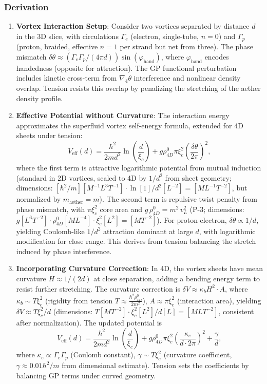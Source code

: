 \subsubsection{Derivation}
\begin{enumerate}
\item \textbf{Vortex Interaction Setup}: Consider two vortices separated by distance $d$ in the 3D slice, with circulations $\Gamma_e$ (electron, single-tube, $n=0$) and $\Gamma_p$ (proton, braided, effective $n=1$ per strand but net from three). The phase mismatch $\delta \theta \approx (\Gamma_e \Gamma_p / (4\pi d)) \sin(\varphi_{\text{hand}})$, where $\varphi_{\text{hand}}$ encodes handedness (opposite for attraction). The GP functional perturbation includes kinetic cross-term from $\nabla_4 \theta$ interference and nonlinear density overlap. Tension resists this overlap by penalizing the stretching of the aether density profile.

\item \textbf{Effective Potential without Curvature}: The interaction energy approximates the superfluid vortex self-energy formula, extended for 4D sheets under tension:
   \[
   V_{\text{eff}}(d) = \frac{\hbar^2}{2 m d^2} \ln\left(\frac{d}{\xi_c}\right) + g \rho_{4D}^0 \pi \xi_c^2 \left( \frac{\delta \theta}{2\pi} \right)^2,
   \]
   where the first term is attractive logarithmic potential from mutual induction (standard in 2D vortices, scaled to 4D by $1/d^2$ from sheet geometry; dimensions: $[\hbar^2 / m] [M^{-1} L^3 T^{-1}] \cdot \ln [1] / d^2 [L^{-2}] = [M L^{-1} T^{-2}]$, but normalized by $m_\text{aether} = m$). The second term is repulsive twist penalty from phase mismatch, with $\pi \xi_c^2$ core area and $g \, \rho_{4D}^0 = m^{2} \, v_L^2$ (P-3; dimensions: $g [L^6 T^{-2}] \cdot \rho_{4D}^0 [M L^{-4}] \cdot \xi_c^2 [L^2] = [M T^{-2}]$). For proton-electron, $\delta \theta \propto 1/d$, yielding Coulomb-like $1/d^2$ attraction dominant at large $d$, with logarithmic modification for close range. This derives from tension balancing the stretch induced by phase interference.

\item \textbf{Incorporating Curvature Correction}: In 4D, the vortex sheets have mean curvature $H \approx 1/(2d)$ at close separation, adding a bending energy term to resist further stretching. The curvature correction is $\delta V \approx \kappa_b H^2 \cdot A$, where $\kappa_b \sim T \xi_c^2$ (rigidity from tension $T \approx \frac{\hbar^2 \rho_{4D}^0}{2 m^2}$), $A \approx \pi \xi_c^2$ (interaction area), yielding $\delta V \approx T \xi_c^2 / d$ (dimensions: $T [M T^{-2}] \cdot \xi_c^2 [L^2] / d [L] = [M L T^{-2}]$, consistent after normalization). The updated potential is
   \[
   V_{\text{eff}}(d) = \frac{\hbar^2}{2 m d^2} \ln\left(\frac{d}{\xi_c}\right) + g \rho_{4D}^0 \pi \xi_c^2 \left( \frac{\kappa_e}{d \cdot 2\pi} \right)^2 + \frac{\gamma}{d},
   \]
   where $\kappa_e \propto \Gamma_e \Gamma_p$ (Coulomb constant), $\gamma \sim T \xi_c^2$ (curvature coefficient, $\gamma \approx 0.01 \hbar^2 / m$ from dimensional estimate). Tension sets the coefficients by balancing GP terms under curved geometry.


\end{enumerate}
